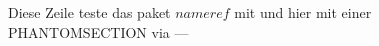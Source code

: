 \documentclass[../Report.tex]{subfiles}
\begin{document}
Diese Zeile teste das paket $ nameref$ mit  und hier mit einer PHANTOMSECTION via ---

%
%
%		
%		
%
%
%
%
%
%		
%

%    
    
\end{document}
